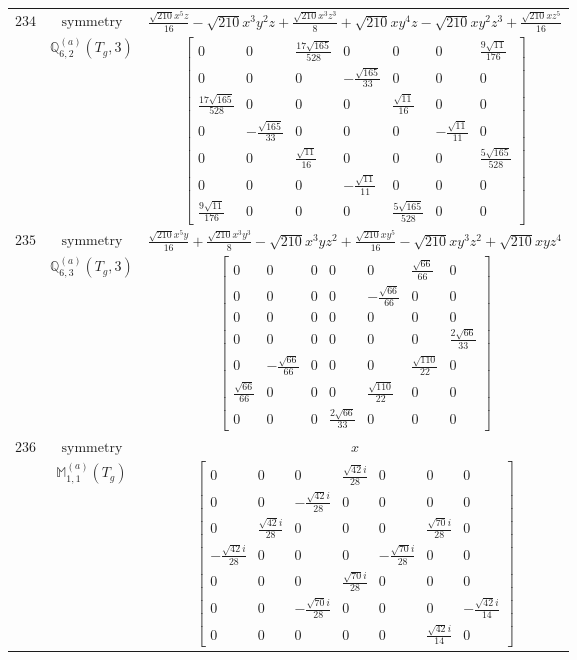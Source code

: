 \documentclass[fleqn,8pt,landscape]{jsarticle}
\begin{document}
\begin{longtable}{ccc}
$ 234 $ & $ \text{symmetry} $ & $ \frac{\sqrt{210} x^{5} z}{16} - \sqrt{210} x^{3} y^{2} z + \frac{\sqrt{210} x^{3} z^{3}}{8} + \sqrt{210} x y^{4} z - \sqrt{210} x y^{2} z^{3} + \frac{\sqrt{210} x z^{5}}{16} $ \\
$  $ & $ \mathbb{Q}_{6,2}^{(a)}(T_{g},3) $ & $ \begin{bmatrix} 0 & 0 & \frac{17 \sqrt{165}}{528} & 0 & 0 & 0 & \frac{9 \sqrt{11}}{176} \\ 0 & 0 & 0 & - \frac{\sqrt{165}}{33} & 0 & 0 & 0 \\ \frac{17 \sqrt{165}}{528} & 0 & 0 & 0 & \frac{\sqrt{11}}{16} & 0 & 0 \\ 0 & - \frac{\sqrt{165}}{33} & 0 & 0 & 0 & - \frac{\sqrt{11}}{11} & 0 \\ 0 & 0 & \frac{\sqrt{11}}{16} & 0 & 0 & 0 & \frac{5 \sqrt{165}}{528} \\ 0 & 0 & 0 & - \frac{\sqrt{11}}{11} & 0 & 0 & 0 \\ \frac{9 \sqrt{11}}{176} & 0 & 0 & 0 & \frac{5 \sqrt{165}}{528} & 0 & 0 \end{bmatrix} $ \\ \hline
$ 235 $ & $ \text{symmetry} $ & $ \frac{\sqrt{210} x^{5} y}{16} + \frac{\sqrt{210} x^{3} y^{3}}{8} - \sqrt{210} x^{3} y z^{2} + \frac{\sqrt{210} x y^{5}}{16} - \sqrt{210} x y^{3} z^{2} + \sqrt{210} x y z^{4} $ \\
$  $ & $ \mathbb{Q}_{6,3}^{(a)}(T_{g},3) $ & $ \begin{bmatrix} 0 & 0 & 0 & 0 & 0 & \frac{\sqrt{66}}{66} & 0 \\ 0 & 0 & 0 & 0 & - \frac{\sqrt{66}}{66} & 0 & 0 \\ 0 & 0 & 0 & 0 & 0 & 0 & 0 \\ 0 & 0 & 0 & 0 & 0 & 0 & \frac{2 \sqrt{66}}{33} \\ 0 & - \frac{\sqrt{66}}{66} & 0 & 0 & 0 & \frac{\sqrt{110}}{22} & 0 \\ \frac{\sqrt{66}}{66} & 0 & 0 & 0 & \frac{\sqrt{110}}{22} & 0 & 0 \\ 0 & 0 & 0 & \frac{2 \sqrt{66}}{33} & 0 & 0 & 0 \end{bmatrix} $ \\ \hline
$ 236 $ & $ \text{symmetry} $ & $ x $ \\
$  $ & $ \mathbb{M}_{1,1}^{(a)}(T_{g}) $ & $ \begin{bmatrix} 0 & 0 & 0 & \frac{\sqrt{42} i}{28} & 0 & 0 & 0 \\ 0 & 0 & - \frac{\sqrt{42} i}{28} & 0 & 0 & 0 & 0 \\ 0 & \frac{\sqrt{42} i}{28} & 0 & 0 & 0 & \frac{\sqrt{70} i}{28} & 0 \\ - \frac{\sqrt{42} i}{28} & 0 & 0 & 0 & - \frac{\sqrt{70} i}{28} & 0 & 0 \\ 0 & 0 & 0 & \frac{\sqrt{70} i}{28} & 0 & 0 & 0 \\ 0 & 0 & - \frac{\sqrt{70} i}{28} & 0 & 0 & 0 & - \frac{\sqrt{42} i}{14} \\ 0 & 0 & 0 & 0 & 0 & \frac{\sqrt{42} i}{14} & 0 \end{bmatrix} $ \\ \hline

\end{longtable}
\end{document}
